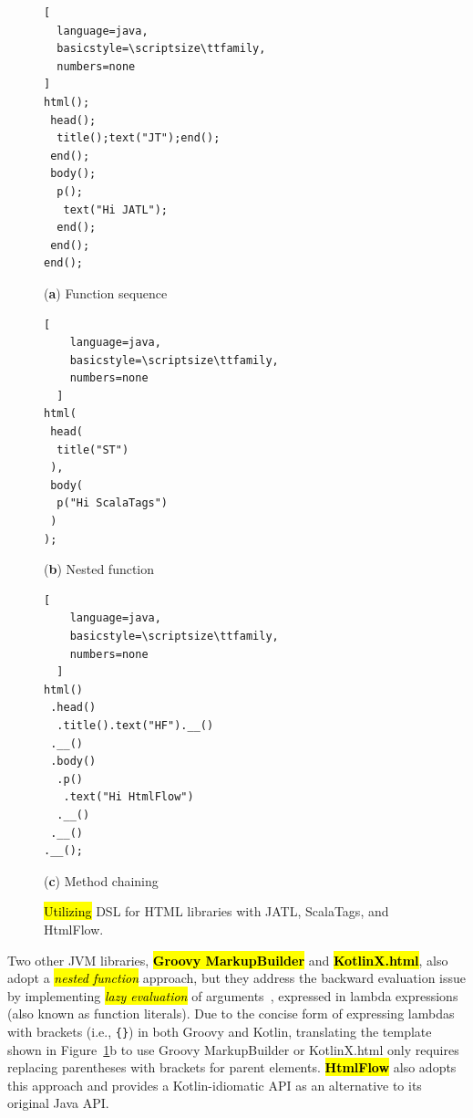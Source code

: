 \documentclass[software,article,accept,pdftex,moreauthors]{Definitions/mdpi}
\begin{document}
\begin{figure}[H]
  \centering

\begin{minipage}[c]{0.33\linewidth}
  \centering
  \begin{lstlisting}[
  language=java,
  basicstyle=\scriptsize\ttfamily,
  numbers=none
]
html();
 head();
  title();text("JT");end();
 end();
 body();
  p();
   text("Hi JATL");
  end();
 end();
end();
  \end{lstlisting}
    \caption*{\centering(\textbf{a}) Function sequence}
  \end{minipage}
  \hfil
  \begin{minipage}[c]{0.23\linewidth}
    \centering
    \begin{lstlisting}[
    language=java,
    basicstyle=\scriptsize\ttfamily,
    numbers=none
  ]
html(
 head(
  title("ST")
 ),
 body(
  p("Hi ScalaTags")
 )
);
  \end{lstlisting}
    \caption*{\centering(\textbf{b}) Nested function}
  \end{minipage}
  \hfil
  \begin{minipage}[c]{0.32\linewidth}
    \centering
    \begin{lstlisting}[
    language=java,
    basicstyle=\scriptsize\ttfamily,
    numbers=none
  ]
html()
 .head()
  .title().text("HF").__()
 .__()
 .body()
  .p()
   .text("Hi HtmlFlow")
  .__()
 .__()
.__();
  \end{lstlisting}
    \caption*{\centering(\textbf{c}) Method chaining}
  \end{minipage}
\vspace*{6pt}
  \caption{\hl{Utilizing} %
 DSL for HTML libraries with JATL, ScalaTags, and HtmlFlow.}
  \label{fig:dsl-idioms}
\end{figure}



Two other JVM libraries, \textbf{\hl{Groovy MarkupBuilder}} and
\textbf{\hl{KotlinX.html}}, also adopt a \textit{\hl{nested function}} approach, but they
address the backward evaluation issue by implementing \textit{\hl{lazy evaluation}}
of arguments~\cite{Landin65}, expressed in lambda expressions (also known as
function literals). Due to the concise form of expressing lambdas with brackets
(i.e., \texttt{\{\}}) in both Groovy and Kotlin, translating the template shown
in Figure~\ref{fig:dsl-idioms}b to use Groovy MarkupBuilder or KotlinX.html
only requires replacing parentheses with brackets for parent elements.
\textbf{\hl{HtmlFlow}} also adopts this approach and provides a Kotlin-idiomatic API
as an alternative to its original Java API.
\end{document}
